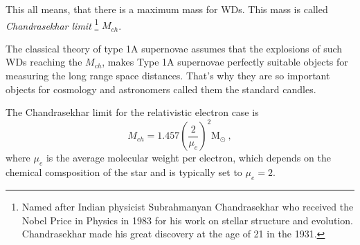 \documentclass[oneside,a4paper,11pt]{report}
\begin{document}
This all means, that there is a maximum mass for WDs. This mass is called \textit{Chandrasekhar limit}
\footnote{Named after Indian physicist Subrahmanyan Chandrasekhar who received the Nobel Price in Physics in 1983 for his 
work on stellar structure and evolution. Chandrasekhar made his great discovery at the age of 21 in the 1931.   } $M_{ch}$.  

The classical theory of type 1A supernovae assumes that the explosions of such WDs reaching the $M_{ch}$, 
makes Type 1A supernovae perfectly suitable objects for measuring the long range 
space distances. That's why they are so important objects for cosmology and astronomers called 
them the standard candles.

The Chandrasekhar limit for the relativistic electron case is
\begin{equation}
 \label{chlim}
M_{ch}=1.457\left ( \frac{2}{\mu_e} \right )^2 \mathrm{M_{\odot}} \:,
\end{equation}
where $\mu_e$ is the average molecular weight per electron, which depends on the chemical comsposition of the star and is typically set 
to $\mu_e = 2$. 
\end{document}
